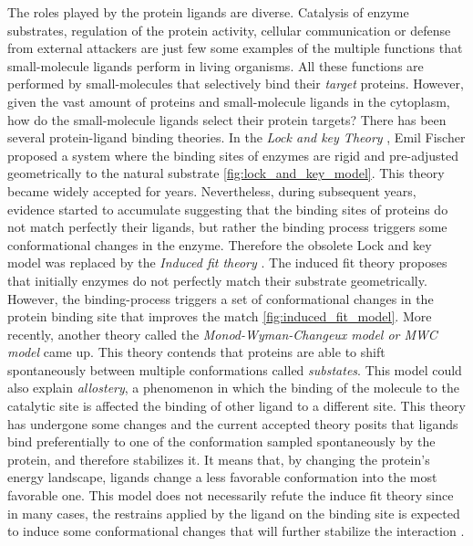 \documentclass[12pt, a4paper,twoside]{tesi_upf}
\begin{document}
\par The roles played by the protein ligands are diverse. Catalysis of enzyme substrates, regulation of the protein activity, cellular communication or defense from external attackers are just few some examples of the multiple functions that small-molecule ligands perform in living organisms. All these functions are performed by small-molecules that selectively bind their \textit{target} proteins. However, given the vast amount of proteins and small-molecule ligands in the cytoplasm, how do the small-molecule ligands select their protein targets? There has been several protein-ligand binding theories. In the \textit{Lock and key Theory} \cite{Cramer1994}, Emil Fischer proposed a system where the binding sites of enzymes are rigid and pre-adjusted geometrically to the natural substrate \ref{fig:lock_and_key_model}. This theory became widely accepted for years. Nevertheless, during subsequent years, evidence started to accumulate suggesting that the binding sites of proteins do not match perfectly their ligands, but rather the binding process triggers some conformational changes in the enzyme. Therefore the obsolete Lock and key model was replaced by the \textit{Induced fit theory} \cite{Koshland1959}. The induced fit theory proposes that initially enzymes do not perfectly match their substrate geometrically. However, the binding-process triggers a set of conformational changes in the protein binding site that improves the match \ref{fig:induced_fit_model}. More recently, another theory called the \textit{Monod-Wyman-Changeux model or  MWC model } came up\cite{Monod1965}. This theory contends that proteins are able to shift spontaneously between multiple conformations called \textit{substates}\cite{Kitao1998, Petsko1984}. This model could also explain \textit{allostery}, a phenomenon in which the binding of the molecule to the catalytic site is affected the binding of other ligand to a different site. This theory has undergone some changes and the current accepted theory posits that ligands bind preferentially to one of the conformation sampled spontaneously by the protein, and therefore stabilizes it. It means that, by changing the protein's energy landscape, ligands change a less favorable conformation into the most favorable one. This model does not necessarily refute the induce fit theory since in many cases, the restrains applied by the ligand on the binding site is expected to induce some conformational changes that will further stabilize the interaction \cite{Foote1994, James2003}. 
\end{document}
